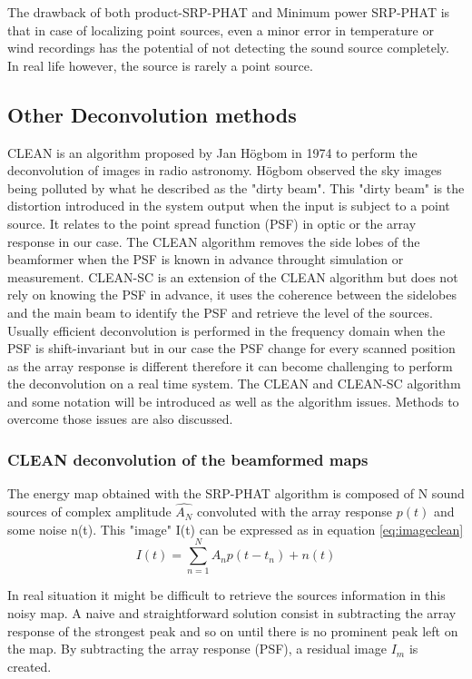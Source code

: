 The drawback of both product-SRP-PHAT and Minimum power SRP-PHAT is that in case of localizing point sources, even a minor error in temperature or wind recordings has the potential of not detecting the sound source completely. In real life however, the source is rarely a point source.

\subsection{Other Deconvolution methods}
CLEAN is an algorithm proposed by Jan Högbom in 1974 \cite{1974A&AS...15..417H} to perform the deconvolution of images in radio astronomy. Högbom observed the sky images being polluted by what he described as the "dirty beam". This "dirty beam" is the distortion introduced in the system output when the input is subject to a point source. It relates to the point spread function (PSF) in optic or the array response in our case. The CLEAN algorithm removes the side lobes of the beamformer when the PSF is known in advance throught simulation or measurement. CLEAN-SC is an extension of the CLEAN algorithm but does not rely on knowing the PSF in advance, it uses the coherence between the sidelobes and the main beam to identify the PSF and retrieve the level of the sources. Usually efficient deconvolution is performed in the frequency domain when the PSF is shift-invariant but in our case the PSF change for every scanned position as the array response is different therefore it can become challenging to perform the deconvolution on a real time system. The CLEAN and CLEAN-SC algorithm and some notation will be introduced as well as the algorithm issues. Methods to overcome those issues are also discussed.

\subsubsection{CLEAN deconvolution of the beamformed maps}

The energy map obtained with the SRP-PHAT algorithm is composed of N sound sources of complex amplitude $\hat{A_{N}}$ convoluted with the array response $p(t)$ and some noise n(t). This "image" I(t) can be expressed as in equation \ref{eq:imageclean}
\begin{equation}
    I(t)=\sum\limits_{n=1}^{N}{A_{n}p(t-t_{n})+n(t)}
    \label{eq:imageclean}
\end{equation}

In real situation it might be difficult to retrieve the sources information in this noisy map. A naive and straightforward solution consist in subtracting the array response of the strongest peak and so on until there is no prominent peak left on the map. By subtracting the array response (PSF), a residual image $I_{m}$ is created.

